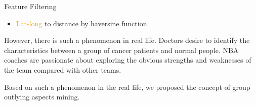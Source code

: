 \documentclass[
 size=14pt,
 paper=smartboard,  %
 mode=present, 		%
 display=slides, 	%
 style=tuliplab,  	%
 pauseslide,
 fleqn,leqno]{powerdot}
\begin{document}

\begin{slide}[toc=,bm=]{Feature Filtering}

\begin{itemize}
\item
\textcolor{orange}{Lat-long} to distance by haversine function.
\end{itemize}

\begin{table}[]
\setlength{\abovecaptionskip}{0pt}
\setlength{\belowcaptionskip}{10pt}
\centering
\caption{Data after distance processing}
\end{table}

\begin{note}
However,
there is such a phenomenon in real life.
Doctors desire to identify the characteristics between
a group of cancer patients and normal people.
NBA coaches are passionate about exploring the obvious strengths and
weaknesses of the team compared with other teams.

Based on such a phenomenon in the real life,
we proposed the concept of group outlying aspects mining.
\end{note}

\end{slide}
\end{document}

